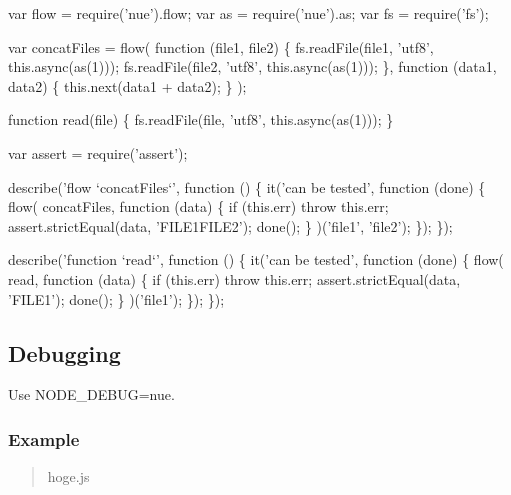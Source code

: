\begin{DoxyCode}
var flow = require(\textcolor{stringliteral}{'nue'}).flow;
var as = require(\textcolor{stringliteral}{'nue'}).as;
var fs = require(\textcolor{stringliteral}{'fs'});

var concatFiles = flow(
  \textcolor{keyword}{function} (file1, file2) \{
    fs.readFile(file1, \textcolor{stringliteral}{'utf8'}, this.async(as(1)));
    fs.readFile(file2, \textcolor{stringliteral}{'utf8'}, this.async(as(1)));
  \},
  \textcolor{keyword}{function} (data1, data2) \{
    this.next(data1 + data2);
  \}
);

\textcolor{keyword}{function} read(file) \{
  fs.readFile(file, \textcolor{stringliteral}{'utf8'}, this.async(as(1)));
\}

var assert = require(\textcolor{stringliteral}{'assert'});

describe(\textcolor{stringliteral}{'flow `concatFiles`'}, \textcolor{keyword}{function} () \{
  it(\textcolor{stringliteral}{'can be tested'}, \textcolor{keyword}{function} (done) \{
    flow(
      concatFiles,
      \textcolor{keyword}{function} (data) \{
        \textcolor{keywordflow}{if} (this.err) \textcolor{keywordflow}{throw} this.err;
        assert.strictEqual(data, \textcolor{stringliteral}{'FILE1FILE2'});
        done();
      \}
    )(\textcolor{stringliteral}{'file1'}, \textcolor{stringliteral}{'file2'});
  \});
\});

describe(\textcolor{stringliteral}{'function `read`'}, \textcolor{keyword}{function} () \{
  it(\textcolor{stringliteral}{'can be tested'}, \textcolor{keyword}{function} (done) \{
    flow(
      read,
      \textcolor{keyword}{function} (data) \{
        \textcolor{keywordflow}{if} (this.err) \textcolor{keywordflow}{throw} this.err;
        assert.strictEqual(data, \textcolor{stringliteral}{'FILE1'});
        done();
      \}
    )(\textcolor{stringliteral}{'file1'});
  \});
\});
\end{DoxyCode}


\subsection*{Debugging}

Use {\ttfamily N\+O\+D\+E\+\_\+\+D\+E\+B\+U\+G=nue}.

\subsubsection*{Example}

\begin{quote}
hoge.\+js \end{quote}



